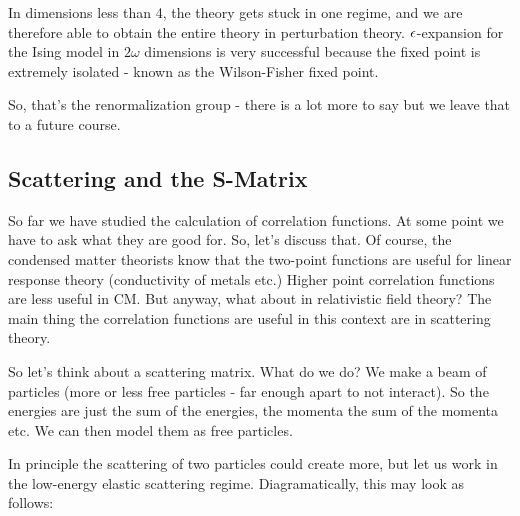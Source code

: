 In dimensions less than 4, the theory gets stuck in one regime, and we are therefore able to obtain the entire theory in perturbation theory. $\epsilon$-expansion for the Ising model in $2\omega$ dimensions is very successful because the fixed point is extremely isolated - known as the Wilson-Fisher fixed point.

So, that's the renormalization group - there is a lot more to say but we leave that to a future course.

\subsection{Scattering and the S-Matrix}
So far we have studied the calculation of correlation functions. At some point we have to ask what they are good for. So, let's discuss that. Of course, the condensed matter theorists know that the two-point functions are useful for linear response theory (conductivity of metals etc.) Higher point correlation functions are less useful in CM. But anyway, what about in relativistic field theory? The main thing the correlation functions are useful in this context are in scattering theory.

So let's think about a scattering matrix. What do we do? We make a beam of particles (more or less free particles - far enough apart to not interact). So the energies are just the sum of the energies, the momenta the sum of the momenta etc. We can then model them as free particles. 

In principle the scattering of two particles could create more, but let us work in the low-energy elastic scattering regime. Diagramatically, this may look as follows:


